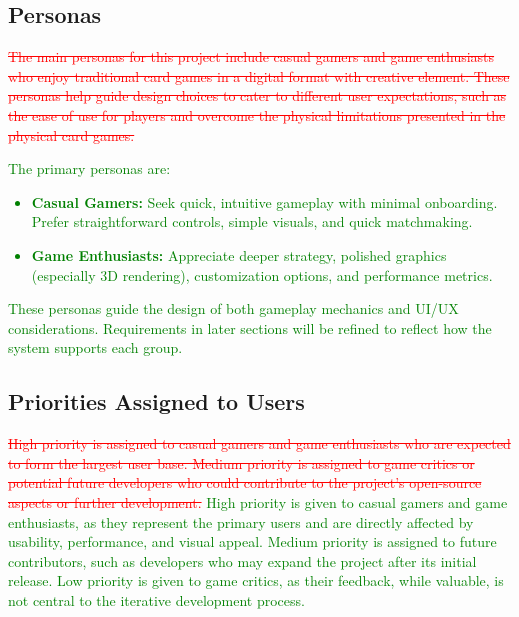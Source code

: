\documentclass[12pt]{article}
\newcommand{\removed}[1]{\textcolor{red}{\sout{#1}}}
\newcommand{\added}[1]{\textcolor{green}{#1}}
\begin{document}
\subsection{Personas}
\removed{The main personas for this project include casual gamers and game enthusiasts who enjoy traditional card games in a digital format with creative element. These personas help guide design choices to cater to different user expectations, such as the ease of use for players and overcome the physical limitations presented in the physical card games.}
\added{The primary personas are:
\begin{itemize}
    \item \textbf{Casual Gamers:} Seek quick, intuitive gameplay with minimal onboarding. Prefer straightforward controls, simple visuals, and quick matchmaking.
    \item \textbf{Game Enthusiasts:} Appreciate deeper strategy, polished graphics (especially 3D rendering), customization options, and performance metrics.
\end{itemize}
These personas guide the design of both gameplay mechanics and UI/UX considerations. Requirements in later sections will be refined to reflect how the system supports each group.}

\subsection{Priorities Assigned to Users}
\removed{High priority is assigned to casual gamers and game enthusiasts who are expected to form the largest user base. Medium priority is assigned to game critics or potential future developers who could contribute to the project’s open-source aspects or further development.}
\added{High priority is given to casual gamers and game enthusiasts, as they represent the primary users and are directly affected by usability, performance, and visual appeal. Medium priority is assigned to future contributors, such as developers who may expand the project after its initial release. Low priority is given to game critics, as their feedback, while valuable, is not central to the iterative development process.}
\end{document}
